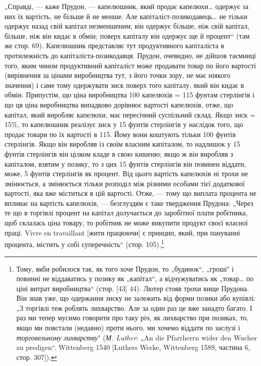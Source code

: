 „Справді, — каже Прудон, — капелюшник, який продає капелюхи\dots{}
одержує за них їх вартість, не більше й не менше. Але
капіталіст-позикодавець\dots{} не тільки одержує назад свій капітал
незменшеним; він одержує більше, ніж свій капітал, більше, ніж
він кидає в обмін; поверх капіталу він одержує ще й процент“
(там же стор. 69). Капелюшник представляє тут продуктивного
капіталіста в протилежність до капіталіста-позикодавця.
Прудон, очевидно, не дійшов таємниці того, яким чином продуктивний
капіталіст може продавати товар по його вартості (вирівнення
за цінами виробництва тут, з його точки зору, не має
ніякого значення) і саме тому одержувати зиск поверх того капіталу,
який він кидає в обмін. Припустім, що ціна виробництва
100 капелюхів = 115 фунтам стерлінгів і що ця ціна виробництва
випадково дорівнює вартості капелюхів, отже, що капітал,
який виробляє капелюхи, має пересічний суспільний склад.
Якщо зиск = 15\%, то капелюшник реалізує зиск у 15 фунтів стерлінгів
у наслідок того, що продає товари по їх вартості в 115.
Йому вони коштують тільки 100 фунтів стерлінгів. Якщо він
виробляв із своїм власним капіталом, то надлишок у 15 фунтів
стерлінгів він цілком кладе в свою кишеню; якщо ж він виробляв
з капіталом, взятим у позику, то з цих 15 фунтів стерлінгів
він повинен віддати, може, 5 фунтів стерлінгів як процент.
Від цього вартість капелюхів ні трохи не змінюється, а змінюється
тільки розподіл між різними особами тієї додаткової
вартості, яка вже міститься в цій вартості. Отже, — тому що
виплата процента не впливає на вартість капелюхів, — безглуздям
є таке твердження Прудона: „Через те що в торгівлі процент
на капітал долучається до заробітної плати робітника, щоб склалась
ціна товару, то робітник не може викупити продукт своєї
власної праці. Vivre en travaillant [жити працюючи] є принцип,
який, при пануванні процента, містить у собі суперечність“
(стор. 105).\footnote{
Тому, якби робилося так, як того хоче Прудон, то „будинок“, „гроші"
і~ повинні не віддаватись у позику як „капітал“, а відчужуватись як „товар\dots{}
по ціні витрат виробництва“ (стор. [43] 44). Лютер стояв трохи вище
Прудона. Він знав уже, що одержання зиску не залежить від форми позики
або купівлі: „З торгівлі теж роблять лихварство. Але за один раз це вже занадто
багато. І раз ми тепер мусимо говорити про таку річ, як лихварство
при позиках, то, якщо ми повстали (недавно) проти нього, ми хочемо віддати
по заслузі і \emph{торговельному лихварству}" (\emph{М. Luther}: „An die Pfarrherrn wider
den Wucher zu predigen“. Wittenberg 1540 [Luthers Werke, Wittenberg 1589, частина
6, стор. 307]).
}


